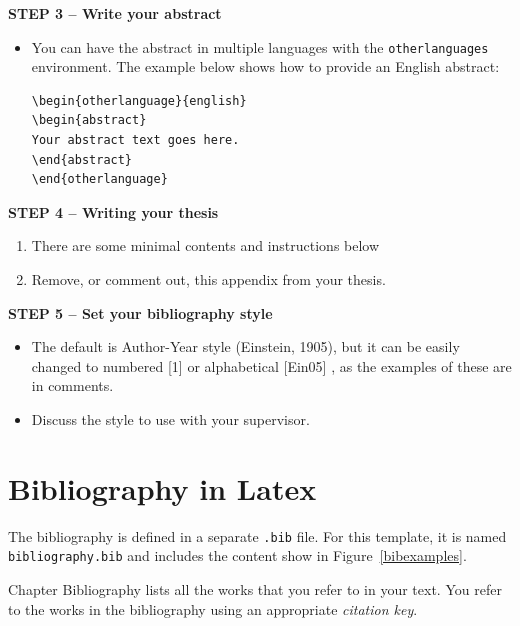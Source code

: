 {\textbf{STEP 3 -- Write your abstract}}

\begin{itemize}
\item You can have the abstract in multiple languages with the \texttt{otherlanguages} environment. The example below shows how to provide an English abstract: 

\begin{verbatim}
\begin{otherlanguage}{english} 
\begin{abstract}
Your abstract text goes here. 
\end{abstract} 
\end{otherlanguage}
\end{verbatim}

\end{itemize}

{\textbf{STEP 4 -- Writing your thesis}}

\begin{enumerate}
\item There are some minimal contents and instructions below 
\item Remove, or comment out, this appendix from your thesis.
\end{enumerate}

{\textbf{STEP 5 -- Set your bibliography style}}

\begin{itemize}
\item The default is Author-Year style (Einstein, 1905), but it can be easily changed to numbered [1] or alphabetical [Ein05] , as the examples of these are in comments.
\item Discuss the style to use with your supervisor.
\end{itemize}

\section{Bibliography in Latex}

The bibliography is defined in a separate \texttt{.bib} file. For this template, it is named \texttt{bibliography.bib} and includes the content show in Figure~\ref{bibexamples}.

Chapter Bibliography lists all the works that you refer to in your text. You refer to the works in the bibliography using an appropriate \emph{citation key}.
%


